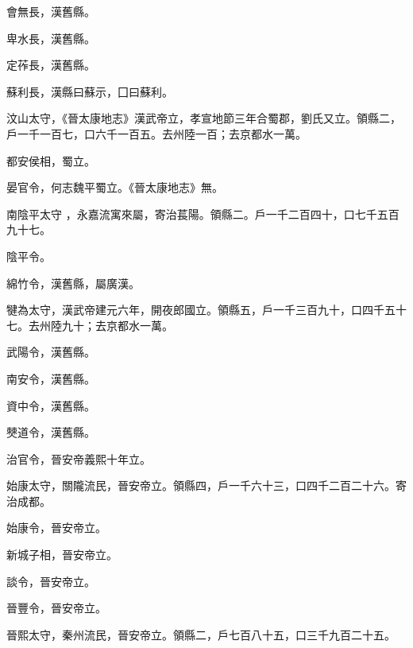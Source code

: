 \begin{pinyinscope}
 會無長，漢舊縣。



 卑水長，漢舊縣。



 定莋長，漢舊縣。



 蘇利長，漢縣曰蘇示，囗曰蘇利。



 汶山太守，《晉太康地志》漢武帝立，孝宣地節三年合蜀郡，劉氏又立。領縣二，戶一千一百七，口六千一百五。去州陸一百；去京都水一萬。



 都安侯相，蜀立。



 晏官令，何志魏平蜀立。《晉太康地志》無。


南陰平太守
 ，永嘉流寓來屬，寄治萇陽。領縣二。戶一千二百四十，口七千五百九十七。


陰平令。



 綿竹令，漢舊縣，屬廣漢。



 犍為太守，漢武帝建元六年，開夜郎國立。領縣五，戶一千三百九十，口四千五十七。去州陸九十；去京都水一萬。



 武陽令，漢舊縣。



 南安令，漢舊縣。



 資中令，漢舊縣。



 僰道令，漢舊縣。



 治官令，晉安帝義熙十年立。



 始康太守，關隴流民，晉安帝立。領縣四，戶一千六十三，口四千二百二十六。寄治成都。



 始康令，晉安帝立。



 新城子相，晉安帝立。



 談令，晉安帝立。



 晉豐令，晉安帝立。



 晉熙太守，秦州流民，晉安帝立。領縣二，戶七百八十五，口三千九百二十五。




\end{pinyinscope}
